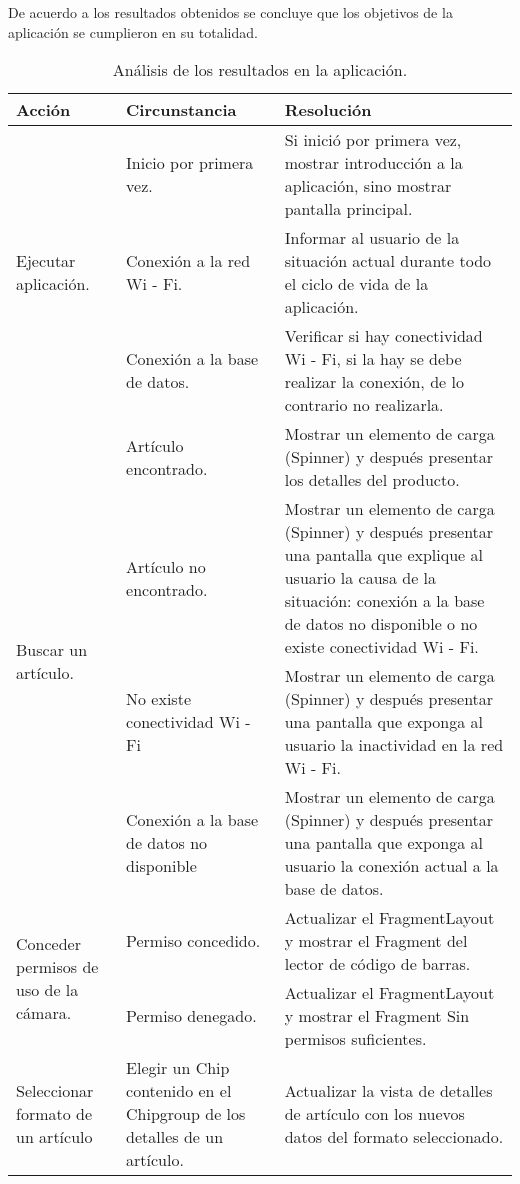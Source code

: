 De acuerdo a los resultados obtenidos se concluye que los objetivos de la aplicación se cumplieron en su totalidad.
\begin{table}
	\caption{Análisis de los resultados en la aplicación.}
	\centering
	\begin{tabular}{p{5cm} p{5cm} p{6cm}}
		\hline
		Acción & Circunstancia & Resolución \\
		\hline
		\multirow{3}{5cm}{Ejecutar aplicación.} & Inicio por primera vez. & Si inició por primera vez, mostrar introducción a la aplicación, sino mostrar pantalla principal. \\
		& Conexión a la red Wi - Fi. & Informar al usuario de la situación actual durante todo el ciclo de vida de la aplicación. \\
		& Conexión a la base de datos. & Verificar si hay conectividad Wi - Fi, si la hay se debe realizar la conexión, de lo contrario no realizarla. \\
		
		\hline
		\multirow{4}{5cm}{Buscar un artículo.} & Artículo encontrado. & Mostrar un elemento de carga (Spinner) y después presentar los detalles del producto. \\
		& Artículo no encontrado. & Mostrar un elemento de carga (Spinner) y después presentar una pantalla que explique al usuario la causa de la situación: conexión a la base de datos no disponible o no existe conectividad Wi - Fi. \\
		& No existe conectividad Wi - Fi & Mostrar un elemento de carga (Spinner) y después presentar una pantalla  que exponga al usuario la inactividad en la red Wi - Fi. \\
		& Conexión a la base de datos no disponible & Mostrar un elemento de carga (Spinner) y después presentar una pantalla  que exponga al usuario la conexión actual a la base de datos. \\
		
		\hline
		\multirow{2}{5cm}{Conceder permisos de uso de la cámara.} & Permiso concedido. & Actualizar el FragmentLayout y mostrar el Fragment del lector de código de barras. \\
		& Permiso denegado. & Actualizar el FragmentLayout y mostrar el Fragment Sin permisos suficientes. \\
		
		\hline
		Seleccionar formato de un artículo & Elegir un Chip contenido en el Chipgroup de los detalles de un artículo. & Actualizar la vista de detalles de artículo con los nuevos datos del formato seleccionado. \\
		\hline
	\end{tabular}
	\label{tabla_analisis}
\end{table}
